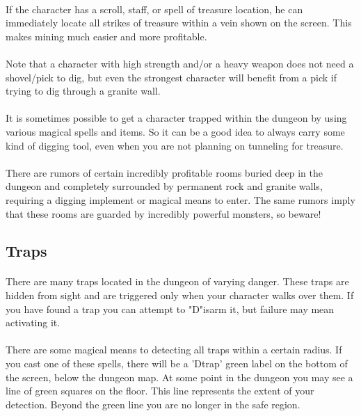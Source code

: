 \paragraph{}If the character has a scroll, staff, or spell of treasure
location, he can immediately locate all strikes of treasure within a
vein shown on the screen. This makes mining much easier and more
profitable.

\paragraph{}Note that a character with high strength and/or a heavy
weapon does not need a shovel/pick to dig, but even the strongest
character will benefit from a pick if trying to dig through a granite
wall.

\paragraph{}It is sometimes possible to get a character trapped within
the dungeon by using various magical spells and items. So it can be a
good idea to always carry some kind of digging tool, even when you are
not planning on tunneling for treasure.

\paragraph{}There are rumors of certain incredibly profitable rooms
buried deep in the dungeon and completely surrounded by permanent rock and
granite walls, requiring a digging implement or magical means to enter.
The same rumors imply that these rooms are guarded by incredibly
powerful monsters, so beware!

\subsection{Traps}
\paragraph{}There are many traps located in the dungeon of varying
danger. These traps are hidden from sight and are triggered only when
your character walks over them. If you have found a trap you can attempt
to "D"isarm it, but failure may mean activating it.

\paragraph{}There are some magical means to detecting all traps within a
certain radius.  If you cast one of these spells, there will be a
'Dtrap' green label on the bottom of the screen, below the dungeon map.
At some point in the dungeon you may see a line of green squares on the
floor. This line represents the extent of your detection. Beyond the
green line you are no longer in the safe region.

